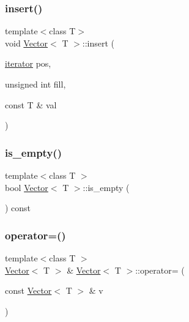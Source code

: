 \mbox{\label{classVector_ae4295ecbebe91ddef92c0e0d67f5be68_ae4295ecbebe91ddef92c0e0d67f5be68}} 
\subsubsection{\texorpdfstring{insert()}{insert()}\hspace{0.1cm}{\footnotesize\ttfamily [2/2]}}
{\footnotesize\ttfamily template$<$class T$>$ \\
void \hyperlink{classVector}{Vector}$<$ T $>$\+::insert (\begin{DoxyParamCaption}\item[{\hyperlink{classVector_1_1iterator}{iterator}}]{pos,  }\item[{unsigned int}]{fill,  }\item[{const T \&}]{val }\end{DoxyParamCaption})}

\mbox{\label{classVector_a03a683aee83b3e9e0369a9e431a9259b_a03a683aee83b3e9e0369a9e431a9259b}} 
\subsubsection{\texorpdfstring{is\+\_\+empty()}{is\_empty()}}
{\footnotesize\ttfamily template$<$class T $>$ \\
bool \hyperlink{classVector}{Vector}$<$ T $>$\+::is\+\_\+empty (\begin{DoxyParamCaption}{ }\end{DoxyParamCaption}) const}

\mbox{\label{classVector_a8d6906176604f2201919991acf655d13_a8d6906176604f2201919991acf655d13}} 
\subsubsection{\texorpdfstring{operator=()}{operator=()}}
{\footnotesize\ttfamily template$<$class T $>$ \\
\hyperlink{classVector}{Vector}$<$ T $>$ \& \hyperlink{classVector}{Vector}$<$ T $>$\+::operator= (\begin{DoxyParamCaption}\item[{const \hyperlink{classVector}{Vector}$<$ T $>$ \&}]{v }\end{DoxyParamCaption})}

